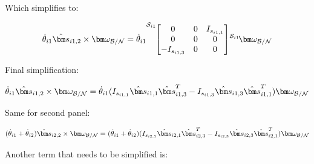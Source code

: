 Which simplifies to:

\begin{equation}
	[I_{\text{sp}_{i1},S_{c,i1}}] \dot{\theta}_{i1} \hat{\bm s}_{i1,2} \times \bm \omega_{\cal{B/N}} = \dot{\theta}_{i1} {\vphantom{\begin{bmatrix}
				I_{s_{i1,1}} & 0 & 0 \\
				0 & I_{s_{i1,2}} & 0 \\
				0 & 0 & I_{s_{i1,3}}
	\end{bmatrix}}}^{\mathcal{S}_{i1}\!}{\begin{bmatrix}
			0 & 0 & I_{s_{i1,1}} \\
			0 & 0 & 0 \\
			-I_{s_{i1,3}} & 0 & 0
	\end{bmatrix}} {\vphantom{\bm \omega_{\cal{B/N}}}}^{\mathcal{S}_{i1}\!}{\bm \omega_{\cal{B/N}}}
\end{equation}

Final simplification:

\begin{equation}
	[I_{\text{sp}_{i1},S_{c,i1}}] \dot{\theta}_{i1} \hat{\bm s}_{i1,2} \times \bm \omega_{\cal{B/N}} = \dot{\theta}_{i1} (I_{s_{i1,1}} \hat{\bm s}_{i1,1} \hat{\bm s}_{i1,3}^T - I_{s_{i1,3}} \hat{\bm s}_{i1,3} \hat{\bm s}_{i1,1}^T) \bm \omega_{\cal{B/N}}
\end{equation}

Same for second panel:

\begin{equation}
	[I_{\text{sp}_{i2},S_{c,i2}}] (\dot{\theta}_{i1}  + \dot{\theta}_{i2})  \hat{\bm s}_{i2,2} \times \bm \omega_{\cal{B/N}} = (\dot{\theta}_{i1}  + \dot{\theta}_{i2}) (I_{s_{i2,1}} \hat{\bm s}_{i2,1} \hat{\bm s}_{i2,3}^T - I_{s_{i2,3}} \hat{\bm s}_{i2,3} \hat{\bm s}_{i2,1}^T) \bm \omega_{\cal{B/N}}
\end{equation}

Another term that needs to be simplified is:

